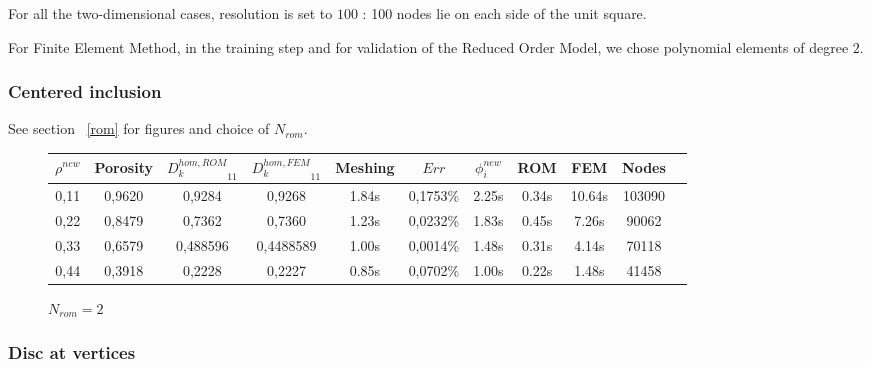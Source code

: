 
For all the two-dimensional cases, resolution is set to $100$ : %
100 nodes lie on each side of the unit square.

\par
For Finite Element Method, in the training step and for validation of the Reduced Order Model, we chose polynomial elements of degree $2$.

\subsubsection{Centered inclusion}

See section \ \ref{rom} for figures and choice of $N_{rom}$.
\begin{figure}[H]%
%
\begin{center}
\begin{tabular}{|c|c||c|c||c|c||c||c|c||c||c|}
\hline
\rowcolor{lightgray} $\rho^{new}$&Porosity&${D_k^{hom,ROM}}_{11}$&${D_k^{hom,FEM}}_{11}$&Meshing&$Err$&$\phi_i^{new}$&ROM&FEM&Nodes\\
\hline
0,11&0,9620&0,9284&0,9268&1.84s&0,1753\%&2.25s&0.34s&10.64s&103090\\
\hline
0,22&0,8479&0,7362&0,7360&1.23s&0,0232\%&1.83s&0.45s&7.26s&90062\\
\hline
0,33&0,6579&0,488596&0,4488589&1.00s&0,0014\%&1.48s&0.31s&4.14s&70118\\
\hline
0,44&0,3918&0,2228&0,2227&0.85s&0,0702\%&1.00s&0.22s&1.48s&41458\\
\hline
\end{tabular}
\end{center}
\caption{$N_{rom}=2$}
%
\end{figure}

\subsubsection{Disc at vertices}

